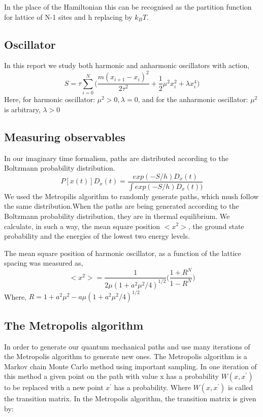 \documentclass{article}
\begin{document}
\noindent
In the place of the Hamiltonian this can be recognised as the partition function for lattice of N-1 sites and h replacing by $k_BT$.

\subsection{Oscillator}
In this report we study both harmonic and anharmonic oscillators with action,
\begin{equation}
S= \tau\sum_{i=0}^{N}\bigg( \frac{ m(x_{i+1} -x_i)^2}{2\tau^2} + \frac {1}{2}\mu^2x_i^2 +\lambda x_i^4\bigg)
\end{equation}
Here, for harmonic oscillator: $\mu^2>0,  \lambda=0$, and for the anharmonic oscillator: $\mu^2$ is arbitrary,  $\lambda>0$

\subsection{Measuring observables}
In our imaginary time formalism, paths are distributed according to the Boltzmann probability distribution.
\begin{equation}
P[x(t)]D_x(t)=\frac{exp(-S/h)D_x(t)}{\int exp(-S/h)D_x(t))}
\end{equation}
We used the Metropilis algorithm to randomly generate paths, which mush follow the same distribution.When the paths are being generated according to the Boltzmann probability distribution, they are in thermal equilibrium. We calculate, in such a way, the mean square position $<x^2>$, the ground state probability and the energies of the lowest two energy levels.

The mean square position of harmonic oscillator, as a function of the lattice spacing was measured as,
\begin{equation}
<x^2> = \frac {1}{2\mu(1+a^2\mu^2/4)^{1/2}} \bigg( \frac {1+R^N}{1-R^N}\bigg)
\end{equation}{\normalsize {\normalsize }}
Where,  $R= 1+a^2\mu^2-a\mu(1+a^2\mu^2/4)^{1/2}$

\subsection{The Metropolis algorithm}
In order to generate our quantum mechanical paths and use many iterations of the Metropolis algorithm to generate new ones. The Metropolis algorithm is a Markov chain Monte Carlo method using important sampling. In one iteration of this method a given point on the path with value x has a probability $W(x, x^\prime)$ to be replaced with a new point $x^\prime$ has a probability. Where $W(x, x^\prime)$ is called the transition matrix. In the Metropolis algorithm, the transition matrix is given by:
\end{document}
